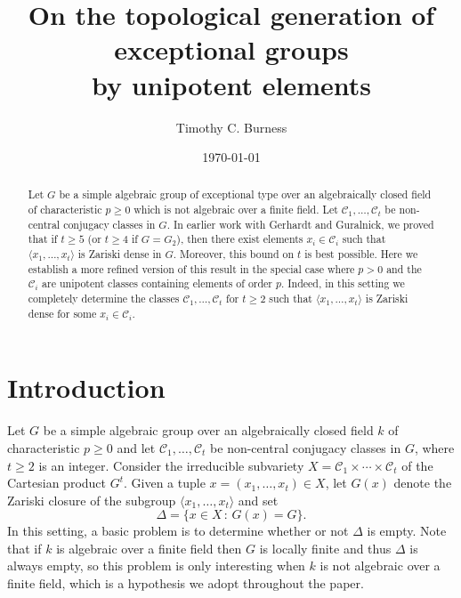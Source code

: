 \documentclass[twoside,a4paper,reqno,11pt]{amsart}
\newcommand{\<}{\langle}
\renewcommand{\>}{\rangle}
\newcommand{\la}{\langle}
\newcommand{\ra}{\rangle}
\newcommand{\geqs}{\geqslant}
\renewcommand{\:}{\colon}
\theoremstyle{plain}
\theoremstyle{definition}
\begin{document}
\title[Topological generation by unipotent elements]{On the topological generation of exceptional groups \\ by unipotent elements}

\author{Timothy C. Burness}
\address{T.C. Burness, School of Mathematics, University of Bristol, Bristol BS8 1UG, UK}

\date{\today} 

\begin{abstract}
Let $G$ be a simple algebraic group of exceptional type over an algebraically closed field  of characteristic $p \geqs 0$ which is not algebraic over a finite field. Let $\mathcal{C}_1, \ldots, \mathcal{C}_t$ be non-central conjugacy classes in $G$. In earlier work with Gerhardt and Guralnick, we proved that if $t \geqs 5$ (or $t \geqs 4$ if $G = G_2$), then there exist elements $x_i \in \mathcal{C}_i$ such that $\la x_1, \ldots, x_t \ra$ is Zariski dense in $G$. Moreover, this bound on $t$ is best possible. Here we establish a more refined version of this result in the special case where $p>0$ and the $\mathcal{C}_i$ are unipotent classes containing elements of order $p$. Indeed, in this setting we completely determine the classes $\mathcal{C}_1, \ldots, \mathcal{C}_t$ for $t \geqs 2$ such that $\la x_1, \ldots, x_t \ra$ is Zariski dense for some $x_i \in \mathcal{C}_i$.      
\end{abstract}

\maketitle

\section{Introduction}\label{s:intro}

Let $G$ be a simple algebraic group over an algebraically closed field $k$ of characteristic $p \geqs 0$ and let $\mathcal{C}_1, \ldots, \mathcal{C}_t$ be non-central conjugacy classes in $G$, where $t \geqs 2$ is an integer. Consider the irreducible subvariety $X = \mathcal{C}_1 \times \cdots \times \mathcal{C}_t$ of the Cartesian product $G^t$. Given a tuple $x = (x_1, \ldots, x_t) \in X$, let $G(x)$ denote the Zariski closure of the subgroup $\la x_1, \ldots, x_t\ra$ and set
\[
\Delta = \{ x \in X \, : \, G(x) = G\}.
\]
In this setting, a basic problem is to determine whether or not $\Delta$ is empty. Note that if $k$ is algebraic over a finite field then $G$ is locally finite and thus $\Delta$ is always empty, so this problem is only interesting when $k$ is not algebraic over a finite field, which is a hypothesis we adopt throughout the paper.
\end{document}
